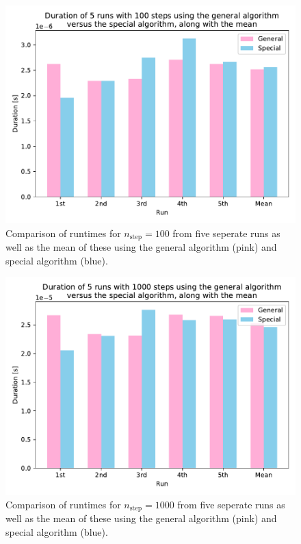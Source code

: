 \documentclass[english,notitlepage]{revtex4-1}  %
\begin{document}
\begin{figure}[h!]
    \centering 
    \includegraphics[scale=0.80]{../data/runtime_comparison_100.pdf} %
    \caption{Comparison of runtimes for $n_\text{step} = 100$ from five seperate runs as well as the mean of these using the general algorithm (pink) and special algorithm (blue).}
    \label{timing 2}
\end{figure}

\begin{figure}[h!]
    \centering 
    \includegraphics[scale=0.80]{../data/runtime_comparison_1000.pdf} %
    \caption{Comparison of runtimes for $n_\text{step} = 1000$ from five seperate runs as well as the mean of these using the general algorithm (pink) and special algorithm (blue).}
    \label{timing 3}
\end{figure}
\end{document}
